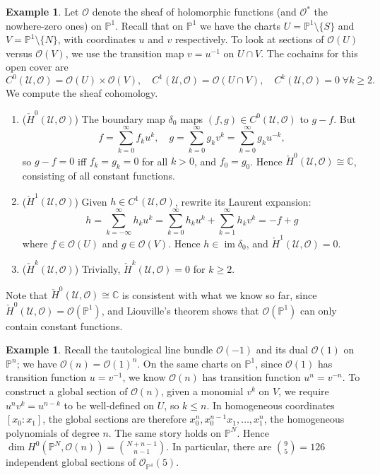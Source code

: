 \documentclass{report}
\theoremstyle{plain}
\theoremstyle{definition}
\newtheorem{example}[theorem]{Example}
\theoremstyle{remark}
\newcommand{\bC}{\mathbb{C}}
\newcommand{\bP}{\mathbb{P}}
\newcommand{\cO}{\mathcal{O}}
\newcommand{\cU}{\mathcal{U}}
\DeclareMathOperator{\im}{im}
\newcommand{\chH}{\check{H}}
\begin{document}
\begin{example}
  Let $\cO$ denote the sheaf of holomorphic functions (and $\cO^*$ the
  nowhere-zero ones) on $\bP^1$. Recall that on $\bP^1$ we have the
  charts $U = \bP^1 \setminus \{S\}$ and $V = \bP^1 \setminus \{N\}$,
  with coordinates $u$ and $v$ respectively. To look at sections of
  $\cO(U)$ versus $\cO(V)$, we use the transition map $v = u^{-1}$ on
  $U \cap V$. The cochains for this open cover are
  \[ C^0(\cU, \cO) = \cO(U) \times \cO(V), \quad C^1(\cU, \cO) = \cO(U \cap V), \quad C^k(\cU, \cO) = 0 \; \forall k \ge 2. \]
  We compute the sheaf cohomology.
  \begin{enumerate}
  \item ($\chH^0(\cU, \cO)$) The boundary map $\delta_0$ maps $(f, g)
    \in C^0(\cU, \cO)$ to $g - f$. But
    \[ f = \sum_{k=0}^\infty f_k u^k, \quad g = \sum_{k=0}^\infty g_k v^k = \sum_{k=0}^\infty g_k u^{-k}, \]
    so $g - f = 0$ iff $f_k = g_k = 0$ for all $k > 0$, and $f_0 =
    g_0$. Hence $\chH^0(\cU, \cO) \cong \bC$, consisting of all
    constant functions.
  \item ($\chH^1(\cU, \cO)$) Given $h \in C^1(\cU, \cO)$, rewrite its
    Laurent expansion:
    \[ h = \sum_{k=-\infty}^\infty h_k u^k = \sum_{k=0}^\infty h_k u^k + \sum_{k=1}^{\infty} h_k v^k = -f + g \]
    where $f \in \cO(U)$ and $g \in \cO(V)$. Hence $h \in \im
    \delta_0$, and $\chH^1(\cU, \cO) = 0$.
  \item ($\chH^k(\cU, \cO)$) Trivially, $\chH^k(\cU, \cO) = 0$ for $k
    \ge 2$.
  \end{enumerate}
  Note that $\chH^0(\cU, \cO) \cong \bC$ is consistent with what we
  know so far, since $\chH^0(\cU, \cO) = \cO(\bP^1)$, and Liouville's
  theorem shows that $\cO(\bP^1)$ can only contain constant functions.
\end{example}

\begin{example}
  Recall the tautological line bundle $\cO(-1)$ and its dual $\cO(1)$
  on $\bP^n$; we have $\cO(n) = \cO(1)^n$. On the same charts on
  $\bP^1$, since $\cO(1)$ has transition function $u = v^{-1}$, we
  know $\cO(n)$ has transition function $u^n = v^{-n}$. To construct a
  global section of $\cO(n)$, given a monomial $v^k$ on $V$, we
  require $u^n v^k = u^{n-k}$ to be well-defined on $U$, so $k \le n$.
  In homogeneous coordinates $[x_0 : x_1]$, the global sections are
  therefore $x_0^n, x_0^{n-1}x_1, \ldots, x_1^n$, the homogeneous
  polynomials of degree $n$. The same story holds on $\bP^N$. Hence
  $\dim H^0(\bP^N, \cO(n)) = \binom{N+n-1}{n-1}$. In particular, there
  are $\binom{9}{5} = 126$ independent global sections of
  $\cO_{\bP^4}(5)$.
\end{example}
\end{document}
